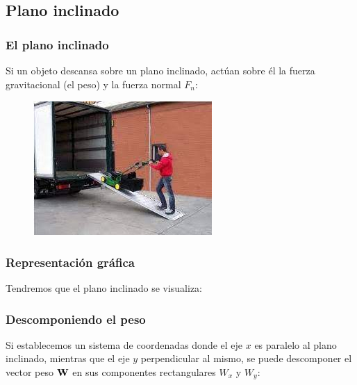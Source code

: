 \documentclass[14pt]{beamer}
\begin{document}
\subsection{Plano inclinado}

\begin{frame}
\frametitle{El plano inclinado}
Si un objeto descansa sobre un plano inclinado, actúan sobre él la fuerza gravitacional (el peso) y la fuerza normal $F_{n}$:
\pause
\begin{figure}
    \centering
    \includegraphics[scale=0.5]{Imagenes/Plano_inclinado_01.jpg}
\end{figure}
\end{frame}
\begin{frame}
\frametitle{Representación gráfica}
Tendremos que el plano inclinado se visualiza:
\pause
\begin{figure}
\centering
{}
\end{figure}
\end{frame}
\begin{frame}
\frametitle{Descomponiendo el peso}
Si establecemos un sistema de coordenadas donde el eje $x$ es paralelo al plano inclinado, \pause mientras que el eje $y$ perpendicular al mismo, \pause se puede descomponer el vector peso $\vb{W}$ en sus componentes rectangulares $W_{x}$ y $W_{y}$:
\end{frame}
\end{document}
